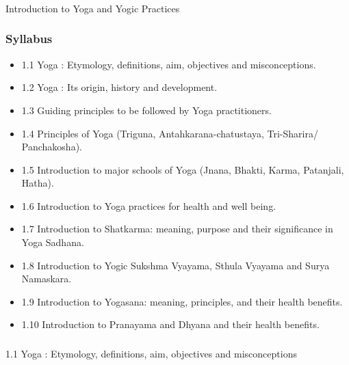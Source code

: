\begin{frame}[fragile]\frametitle{}
\begin{center}
{\Large Introduction to Yoga and Yogic Practices}
\end{center}
\end{frame}

\begin{frame}[fragile]\frametitle{Syllabus}

\begin{itemize}
\item 1.1  Yoga : Etymology, definitions, aim, objectives and misconceptions. 
\item 1.2  Yoga : Its origin, history and development. 
\item 1.3  Guiding principles to be followed by Yoga practitioners.  
\item 1.4  Principles of Yoga (Triguna, Antahkarana-chatustaya, Tri-Sharira/ Panchakosha). 
\item 1.5  Introduction to major schools of Yoga (Jnana, Bhakti, Karma, Patanjali, Hatha). 
\item 1.6  Introduction to Yoga practices for health and well being. 
\item 1.7  Introduction to Shatkarma: meaning, purpose and their significance in Yoga Sadhana. 
\item 1.8  Introduction to Yogic  Sukshma Vyayama,  Sthula Vyayama and Surya Namaskara.  
\item 1.9  Introduction to Yogasana: meaning, principles, and their health benefits. 
\item 1.10  Introduction to Pranayama and Dhyana and their health benefits. 
\end{itemize}
	  
\end{frame}


\begin{frame}[fragile]\frametitle{}
\begin{center}
{\Large 1.1 Yoga : Etymology, definitions, aim, objectives and misconceptions}
\end{center}
\end{frame}

